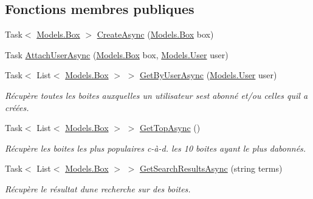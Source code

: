 \subsection*{Fonctions membres publiques}
\begin{DoxyCompactItemize}
\item 
Task$<$ \hyperlink{class_boxes_1_1_models_1_1_box}{Models.\+Box} $>$ \hyperlink{class_boxes_1_1_services_1_1_box_1_1_design_box_service_a6bc334ac212ab2ff7d5428c68bbf6307}{Create\+Async} (\hyperlink{class_boxes_1_1_models_1_1_box}{Models.\+Box} box)
\item 
Task \hyperlink{class_boxes_1_1_services_1_1_box_1_1_design_box_service_a35f886f31e9a7149f2c66ed391526a77}{Attach\+User\+Async} (\hyperlink{class_boxes_1_1_models_1_1_box}{Models.\+Box} box, \hyperlink{class_boxes_1_1_models_1_1_user}{Models.\+User} user)
\item 
Task$<$ List$<$ \hyperlink{class_boxes_1_1_models_1_1_box}{Models.\+Box} $>$ $>$ \hyperlink{class_boxes_1_1_services_1_1_box_1_1_design_box_service_a12e7904b334a2c867644d0aec7ab16d3}{Get\+By\+User\+Async} (\hyperlink{class_boxes_1_1_models_1_1_user}{Models.\+User} user)
\begin{DoxyCompactList}\small\item\em Récupère toutes les boites auxquelles un utilisateur s\textquotesingle{}est abonné et/ou celles qu\textquotesingle{}il a créées.  \end{DoxyCompactList}\item 
Task$<$ List$<$ \hyperlink{class_boxes_1_1_models_1_1_box}{Models.\+Box} $>$ $>$ \hyperlink{class_boxes_1_1_services_1_1_box_1_1_design_box_service_ab7ca221e2a93ceea5e0671790f81baef}{Get\+Top\+Async} ()
\begin{DoxyCompactList}\small\item\em Récupère les boites les plus populaires c-\/à-\/d. les 10 boites ayant le plus d\textquotesingle{}abonnés.  \end{DoxyCompactList}\item 
Task$<$ List$<$ \hyperlink{class_boxes_1_1_models_1_1_box}{Models.\+Box} $>$ $>$ \hyperlink{class_boxes_1_1_services_1_1_box_1_1_design_box_service_acccdb71b925edff731149761bc9273d5}{Get\+Search\+Results\+Async} (string terms)
\begin{DoxyCompactList}\small\item\em Récupère le résultat d\textquotesingle{}une recherche sur des boites.  \end{DoxyCompactList}\item 

\end{DoxyCompactItemize}
